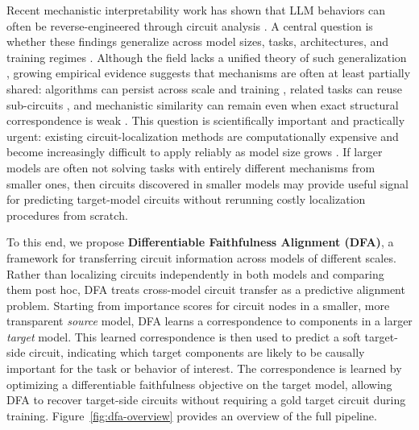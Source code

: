 \documentclass{article} %
\begin{document}
Recent mechanistic interpretability work has shown that LLM behaviors can often be reverse-engineered through circuit analysis \citep{wang2022interpretability, hanna2024eapig, marks2024saecircuits}. A central question is whether these findings generalize across model sizes, tasks, architectures, and training regimes \citep{wang2024universality}. Although the field lacks a unified theory of such generalization \citep{trott2025theory}, growing empirical evidence suggests that mechanisms are often at least partially shared: algorithms can persist across scale and training \citep{lieberum2023scale, tigges2024llm, prakash2023fine}, related tasks can reuse sub-circuits \citep{merullo2024circuitreuse, lan2024towards, mondorf2025modular}, and mechanistic similarity can remain even when exact structural correspondence is weak \citep{wang2024universality, nikankin2025sametask}. This question is scientifically important and practically urgent: existing circuit-localization methods are computationally expensive and become increasingly difficult to apply reliably as model size grows \citep{hanna2024eapig}. If larger models are often not solving tasks with entirely different mechanisms from smaller ones, then circuits discovered in smaller models may provide useful signal for predicting target-model circuits without rerunning costly localization procedures from scratch.







To this end, we propose \textbf{Differentiable Faithfulness Alignment (DFA)}, a framework for transferring circuit information across models of different scales. Rather than localizing circuits independently in both models and comparing them post hoc, DFA treats cross-model circuit transfer as a predictive alignment problem. Starting from importance scores for circuit nodes in a smaller, more transparent \emph{source} model, DFA learns a correspondence to components in a larger \emph{target} model. This learned correspondence is then used to predict a soft target-side circuit, indicating which target components are likely to be causally important for the task or behavior of interest. The correspondence is learned by optimizing a differentiable faithfulness objective on the target model, allowing DFA to recover target-side circuits without requiring a gold target circuit during training. Figure~\ref{fig:dfa-overview} provides an overview of the full pipeline.
\end{document}
